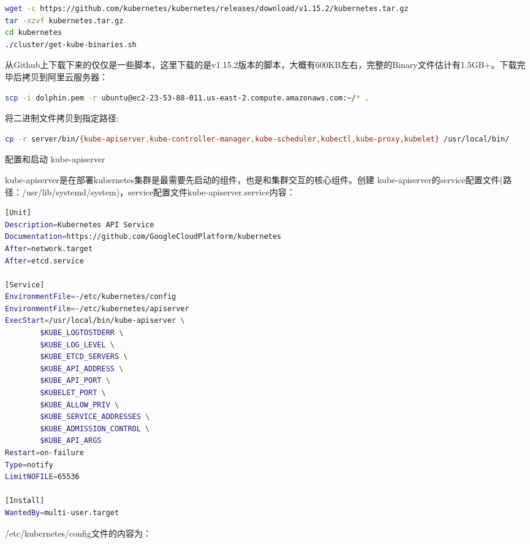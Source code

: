 \documentclass[8pt]{book}
\makeatletter
\numberwithin{dummy}{section}
\theoremstyle{ocrenumbox}
\theoremstyle{blacknumex}
\theoremstyle{blacknumbox}
\theoremstyle{ocrenum}
\renewcommand\paragraph{\@startsection{paragraph}{4}{\z@}
	{-2ex \@plus-.2ex \@minus .2ex}
	{.1ex}
	{\normalfont\small\sffamily\bfseries}}
\makeatother
\begin{document}
\begin{lstlisting}[language=Bash]
wget -c https://github.com/kubernetes/kubernetes/releases/download/v1.15.2/kubernetes.tar.gz
tar -xzvf kubernetes.tar.gz
cd kubernetes
./cluster/get-kube-binaries.sh
\end{lstlisting}

从Github上下载下来的仅仅是一些脚本，这里下载的是v1.15.2版本的脚本，大概有600KB左右，完整的Binary文件估计有1.5GB+。下载完毕后拷贝到阿里云服务器：

\begin{lstlisting}[language=Bash]
scp -i dolphin.pem -r ubuntu@ec2-23-53-88-011.us-east-2.compute.amazonaws.com:~/* .
\end{lstlisting}

将二进制文件拷贝到指定路径:

\begin{lstlisting}[language=Bash]
cp -r server/bin/{kube-apiserver,kube-controller-manager,kube-scheduler,kubectl,kube-proxy,kubelet} /usr/local/bin/
\end{lstlisting}

\paragraph{配置和启动 kube-apiserver}

kube-apiserver是在部署kubernetes集群是最需要先启动的组件，也是和集群交互的核心组件。创建 kube-apiserver的service配置文件(路径：/usr/lib/systemd/system)，service配置文件kube-apiserver.service内容：

\begin{lstlisting}[language=Bash]
[Unit]
Description=Kubernetes API Service
Documentation=https://github.com/GoogleCloudPlatform/kubernetes
After=network.target
After=etcd.service

[Service]
EnvironmentFile=-/etc/kubernetes/config
EnvironmentFile=-/etc/kubernetes/apiserver
ExecStart=/usr/local/bin/kube-apiserver \
        $KUBE_LOGTOSTDERR \
        $KUBE_LOG_LEVEL \
        $KUBE_ETCD_SERVERS \
        $KUBE_API_ADDRESS \
        $KUBE_API_PORT \
        $KUBELET_PORT \
        $KUBE_ALLOW_PRIV \
        $KUBE_SERVICE_ADDRESSES \
        $KUBE_ADMISSION_CONTROL \
        $KUBE_API_ARGS
Restart=on-failure
Type=notify
LimitNOFILE=65536

[Install]
WantedBy=multi-user.target
\end{lstlisting}

/etc/kubernetes/config文件的内容为：
\end{document}
